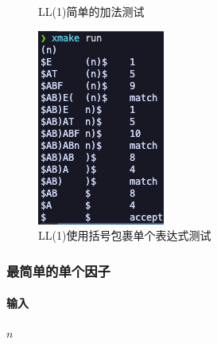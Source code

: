 \begin{figure}[htbp]
\begin{minipage}[t]{0.3\textwidth}
        \caption{LL(1)简单的加法测试}
        \label{fig:ll-2}
    \end{minipage}
    \begin{minipage}[t]{0.3\textwidth}
        \centering
        \includegraphics[width=\textwidth]{images/ll_3.png}
        \caption{LL(1)使用括号包裹单个表达式测试}
        \label{fig:ll-3}
    \end{minipage}
\end{figure}

\subsubsection{最简单的单个因子}
\paragraph{输入} $n$

